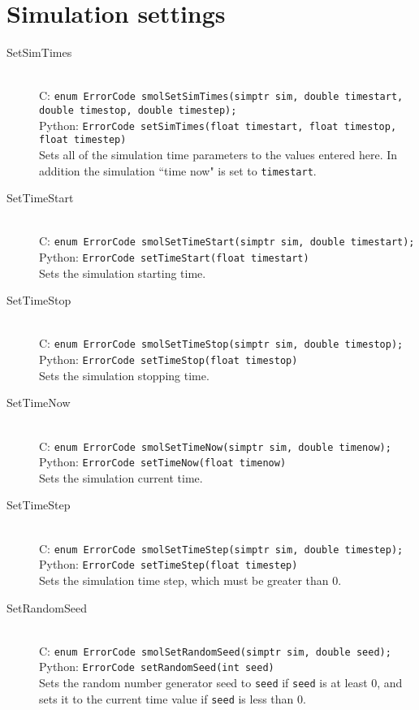\documentclass {book}
\begin{document}
\section{Simulation settings}

\begin{description}

\item[SetSimTimes]
\hfill \\
C: \texttt{enum ErrorCode smolSetSimTimes(simptr sim, double timestart, double timestop, double timestep);}\\
Python: \texttt{ErrorCode setSimTimes(float timestart, float timestop, float timestep)}\\
Sets all of the simulation time parameters to the values entered here. In addition the simulation ``time now" is set to \texttt{timestart}.

\item[SetTimeStart]
\hfill \\
C: \texttt{enum ErrorCode smolSetTimeStart(simptr sim, double timestart);}\\
Python: \texttt{ErrorCode setTimeStart(float timestart)}\\
Sets the simulation starting time.

\item[SetTimeStop]
\hfill \\
C: \texttt{enum ErrorCode smolSetTimeStop(simptr sim, double timestop);}\\
Python: \texttt{ErrorCode setTimeStop(float timestop)}\\
Sets the simulation stopping time.

\item[SetTimeNow]
\hfill \\
C: \texttt{enum ErrorCode smolSetTimeNow(simptr sim, double timenow);}\\
Python: \texttt{ErrorCode setTimeNow(float timenow)}\\
Sets the simulation current time.

\item[SetTimeStep]
\hfill \\
C: \texttt{enum ErrorCode smolSetTimeStep(simptr sim, double timestep);}\\
Python: \texttt{ErrorCode setTimeStep(float timestep)}\\
Sets the simulation time step, which must be greater than 0.

\item[SetRandomSeed]
\hfill \\
C: \texttt{enum ErrorCode smolSetRandomSeed(simptr sim, double seed);}\\
Python: \texttt{ErrorCode setRandomSeed(int seed)}\\
Sets the random number generator seed to \texttt{seed} if \texttt{seed} is at least 0, and sets it to the current time value if \texttt{seed} is less than 0.


\end{description}
\end{document}
